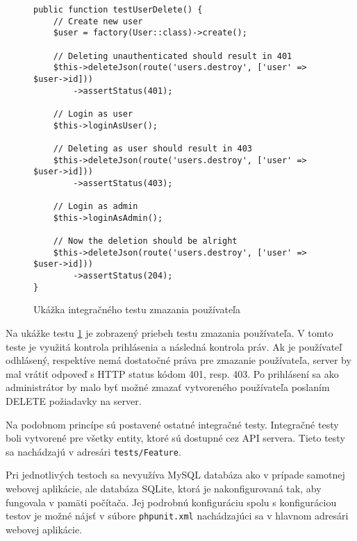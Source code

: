 \begin{figure}[H]
\begin{verbatim}
public function testUserDelete() {
    // Create new user
    $user = factory(User::class)->create();

    // Deleting unauthenticated should result in 401
    $this->deleteJson(route('users.destroy', ['user' => $user->id]))
        ->assertStatus(401);

    // Login as user
    $this->loginAsUser();

    // Deleting as user should result in 403
    $this->deleteJson(route('users.destroy', ['user' => $user->id]))
        ->assertStatus(403);

    // Login as admin
    $this->loginAsAdmin();

    // Now the deletion should be alright
    $this->deleteJson(route('users.destroy', ['user' => $user->id]))
        ->assertStatus(204);
}
\end{verbatim}
\caption[Ukážka integračného testu zmazania používateľa]
{Ukážka integračného testu zmazania používateľa}
\label{user-delete-test-code}
\end{figure}

Na ukážke testu \ref{user-delete-test-code} je zobrazený priebeh testu zmazania používateľa. V tomto teste je využitá kontrola prihlásenia a následná kontrola práv. Ak je používateľ odhlásený, respektíve nemá dostatočné práva pre zmazanie používateľa, server by mal vrátiť odpoveď s HTTP status kódom 401, resp. 403. Po prihlásení sa ako administrátor by malo byť možné zmazať vytvoreného používateľa poslaním DELETE požiadavky na server.

Na podobnom princípe sú postavené ostatné integračné testy. Integračné testy boli vytvorené pre všetky entity, ktoré sú dostupné cez API servera. Tieto testy sa nachádzajú v adresári \texttt{tests/Feature}.

\pagebreak 
Pri jednotlivých testoch sa nevyužíva MySQL databáza ako v prípade samotnej webovej aplikácie, ale databáza SQLite, ktorá je nakonfigurovaná tak, aby fungovala v pamäti počítača. Jej podrobnú konfiguráciu spolu s konfiguráciou testov je možné nájsť v súbore \texttt{phpunit.xml} nachádzajúci sa v hlavnom adresári webovej aplikácie.



